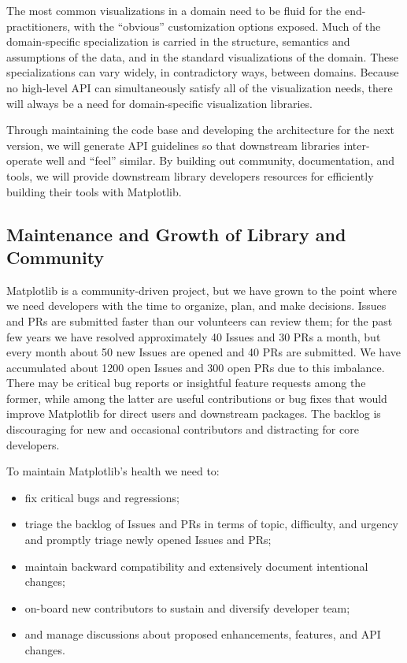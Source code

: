 \documentclass[12pt,letterpaper]{article}  %
\begin{document}
The most common visualizations in a domain need to be fluid for
the end-practitioners, with the ``obvious'' customization options
exposed. Much of the domain-specific specialization is carried in the
structure, semantics and assumptions of the data, and in the standard
visualizations of the domain. These specializations can vary widely,
in contradictory ways, between domains. Because no high-level API can
simultaneously satisfy all of the visualization needs, there will
always be a need for domain-specific visualization libraries.

Through maintaining the code base and developing the architecture for
the next version, we will generate API guidelines so that downstream
libraries inter-operate well and ``feel'' similar. By building out
community, documentation, and tools, we will provide downstream
library developers resources for efficiently building their tools with
Matplotlib.

\subsection{Maintenance and Growth of Library and Community}

Matplotlib is a community-driven project, but we have grown to the
point where we need developers with the time to organize, plan, and
make decisions. Issues and PRs are submitted faster than our
volunteers can review them; for the past few years we have resolved
approximately 40 Issues and 30 PRs a month, but every month about 50
new Issues are opened and 40 PRs are submitted.  We have accumulated
about 1200 open Issues and 300 open PRs due to this imbalance. There
may be critical bug reports or insightful feature requests among the
former, while among the latter are useful contributions or bug fixes
that would improve Matplotlib for direct users and downstream
packages. The backlog is discouraging for new and occasional
contributors and distracting for core developers.

To maintain Matplotlib's health we need to:
\begin{itemize}[noitemsep]
\item fix critical bugs and regressions;
\item triage the backlog of Issues and PRs in terms of topic, difficulty, and urgency and promptly triage newly opened Issues and PRs;
\item maintain backward compatibility and extensively document intentional changes;
\item on-board new contributors to sustain and diversify developer team;
\item and manage discussions about proposed enhancements, features, and API changes.
\end{itemize}
\end{document}
